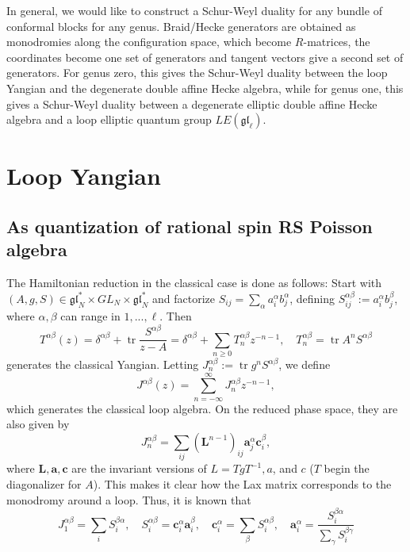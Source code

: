 \documentclass[11pt]{report}
\theoremstyle{definition}
\theoremstyle{remark}
\theoremstyle{remark}
\begin{document}
In general, we would like to construct a Schur-Weyl duality for any bundle of conformal blocks for any genus. Braid/Hecke generators are obtained as monodromies along the configuration space, which become $R$-matrices, the coordinates become one set of generators and tangent vectors give a second set of generators. For genus zero, this gives the Schur-Weyl duality between the loop Yangian and the degenerate double affine Hecke algebra, while for genus one, this gives a Schur-Weyl duality between a degenerate elliptic double affine Hecke algebra and a loop elliptic quantum group $LE(\mathfrak{gl}_\ell)$.

\section{Loop Yangian}

\subsection{As quantization of rational spin RS Poisson algebra}

\cite{article:arutyunov:1998}

The Hamiltonian reduction in the classical case is done as follows: Start with $(A,g,S) \in \mathfrak{gl}_N^* \times GL_N \times \mathfrak{gl}_N^*$ and factorize $S_{ij} = \sum_\alpha a_i^\alpha b_j^\alpha$, defining $S_{ij}^{\alpha\beta} := a_i^\alpha b_j^\beta$, where $\alpha,\beta$ can range in $1,...,\ell$. Then
\begin{equation*}
T^{\alpha\beta}(z) = \delta^{\alpha\beta} + \operatorname{tr} \frac{S^{\alpha\beta}}{z-A} = \delta^{\alpha\beta}+\sum_{n\geq 0} T_n^{\alpha\beta} z^{-n-1}, \quad T_n^{\alpha\beta} = \operatorname{tr} A^n S^{\alpha \beta}
\end{equation*}
generates the classical Yangian. Letting $J_n^{\alpha\beta} := \operatorname{tr} g^n S^{\alpha \beta}$, we define
\begin{equation*}
J^{\alpha \beta}(z) = \sum_{n=-\infty}^\infty J_n^{\alpha \beta} z^{-n-1},
\end{equation*}
which generates the classical loop algebra. On the reduced phase space, they are also given by
\begin{equation*}
J_n^{\alpha\beta} = \sum_{ij} (\mathbf{L}^{n-1})_{ij} \mathbf{a}_j^\alpha \mathbf{c}_i^\beta,
\end{equation*}
where $\mathbf{L},\mathbf{a},\mathbf{c}$ are the invariant versions of $L = TgT^{-1},a$, and $c$ ($T$ begin the diagonalizer for $A$). This makes it clear how the Lax matrix corresponds to the monodromy around a loop. Thus, it is known that
\begin{equation*}
J_1^{\alpha\beta} = \sum_i S_i^{\beta\alpha}, \quad S_i^{\alpha\beta} = \mathbf{c}_i^\alpha \mathbf{a}_i^\beta, \quad \mathbf{c}_i^\alpha = \sum_\beta S_i^{\alpha\beta}, \quad \mathbf{a}_i^\alpha = \frac{S_i^{\beta\alpha}}{\sum_\gamma S_i^{\beta\gamma}}
\end{equation*}
\end{document}
